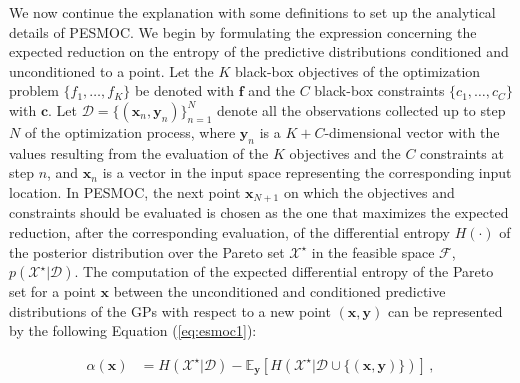 We now continue the explanation with some definitions to set up the analytical details of PESMOC. We begin by formulating the expression concerning the expected reduction on the entropy of the predictive distributions conditioned and unconditioned to a point. Let the $K$ black-box objectives of the optimization problem $\{f_1,\ldots,f_K\}$ be denoted
with $\mathbf{f}$ and the $C$ black-box constraints $\{c_1,\ldots,c_C\}$ with $\mathbf{c}$. Let $\mathcal{D} = \{(\mathbf{x}_n, \mathbf{y}_n)\}_{n=1}^N$ denote all the observations collected up to step $N$ of the optimization process, where $\mathbf{y}_n$ is a $K + C$-dimensional vector with the values resulting from the evaluation of the $K$ objectives and the $C$ constraints at step $n$, and $\mathbf{x}_n$ is a vector
in the input space representing the corresponding input location. In PESMOC, the next
point $\mathbf{x}_{N+1}$ on which the objectives and constraints should be evaluated
is chosen as the one that maximizes the expected reduction, after the corresponding evaluation, of
the differential entropy $H(\cdot)$ of the posterior distribution over the Pareto
set $\mathcal{X}^\star$ in the feasible space $\mathcal{F}$,
$p(\mathcal{X}^\star|\mathcal{D})$. The computation of the expected differential entropy of the Pareto set for a point $\mathbf{x}$ between the unconditioned and conditioned predictive distributions of the GPs with respect to a new point $(\mathbf{x}, \mathbf{y})$ can be represented by the following Equation (\ref{eq:esmoc1}):

\begin{align}
\alpha(\mathbf{x}) & = H(\mathcal{X}^{\star}|\mathcal{D}) - \mathbb{E}_{\textbf{y}} 
        [H(\mathcal{X}^{\star}|\mathcal{D} \cup \{(\textbf{x},\textbf{y})\})]
\label{eq:esmoc1}
\,,
\end{align}

